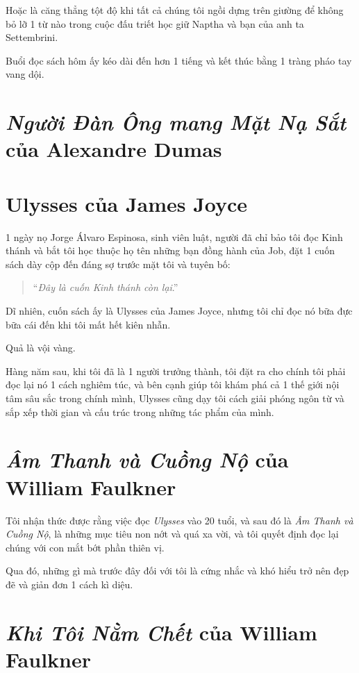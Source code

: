 \documentclass{book}
\numberwithin{equation}{section}
\begin{document}
Hoặc là căng thẳng tột độ khi tất cả chúng tôi ngồi dựng trên giường để không bỏ lỡ 1 từ nào trong cuộc đấu triết học giữ Naptha và bạn của anh ta Settembrini.

Buổi đọc sách hôm ấy kéo dài đến hơn 1 tiếng và kết thúc bằng 1 tràng pháo tay vang dội.

\section{\textit{Người Đàn Ông mang Mặt Nạ Sắt} của Alexandre Dumas}

\section{Ulysses của James Joyce}
1 ngày nọ Jorge Álvaro Espinosa, sinh viên luật, người đã chỉ bảo tôi đọc Kinh thánh và bắt tôi học thuộc họ tên những bạn đồng hành của Job, đặt 1 cuốn sách dày cộp đến đáng sợ trước mặt tôi và tuyên bố:

\begin{quotation}
    ``\textit{Đây là cuốn Kinh thánh còn lại}.''
\end{quotation}
Dĩ nhiên, cuốn sách ấy là Ulysses của James Joyce, nhưng tôi chỉ đọc nó bữa đực bữa cái đến khi tôi mất hết kiên nhẫn.

Quả là vội vàng.

Hàng năm sau, khi tôi đã là 1 người trưởng thành, tôi đặt ra cho chính tôi phải đọc lại nó 1 cách nghiêm túc, và bên cạnh giúp tôi khám phá cả 1 thế giới nội tâm sâu sắc trong chính mình, Ulysses cũng dạy tôi cách giải phóng ngôn từ và sắp xếp thời gian và cấu trúc trong những tác phẩm của mình.

\section{\textit{Âm Thanh và Cuồng Nộ} của William Faulkner}
Tôi nhận thức được rằng việc đọc \textit{Ulysses} vào 20 tuổi, và sau đó là \textit{Âm Thanh và Cuồng Nộ}, là những mục tiêu non nớt và quá xa vời, và tôi quyết định đọc lại chúng với con mắt bớt phần thiên vị.

Qua đó, những gì mà trước đây đối với tôi là cứng nhắc và khó hiểu trở nên đẹp đẽ và giản đơn 1 cách kì diệu.

\section{\textit{Khi Tôi Nằm Chết} của William Faulkner}
\end{document}
